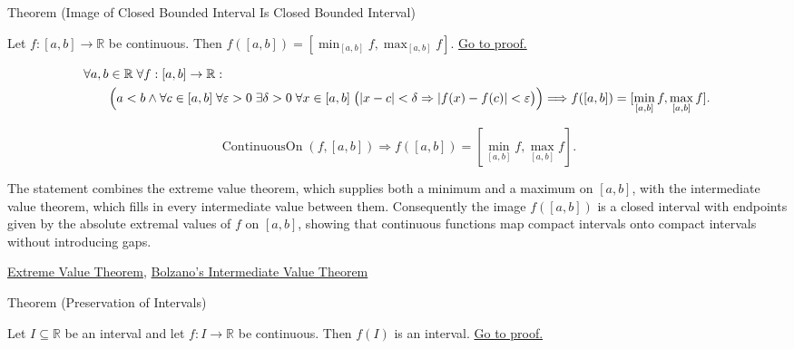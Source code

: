 \begin{theorembox}{Theorem (Image of Closed Bounded Interval Is Closed Bounded Interval)}
\begin{theorem}
\label{thm:image-of-closed-bounded-interval}
Let $f:[a,b]\to\mathbb{R}$ be continuous. Then $f([a,b])=[\min_{[a,b]} f,\max_{[a,b]} f]$.
\hyperref[prf:image-of-closed-bounded-interval]{Go to proof.}
\end{theorem}
\end{theorembox}

\begin{remark*}
\[
\begin{aligned}
&\forall a,b\in\mathbb{R}\;\forall f:[a,b]\to\mathbb{R}:\\
&\qquad
\Bigl(a<b \land
\forall c\in[a,b]\;\forall \varepsilon>0\;\exists \delta>0\;\forall x\in[a,b]\;
\bigl(|x-c|<\delta\Rightarrow |f(x)-f(c)|<\varepsilon\bigr)\Bigr)
\Longrightarrow
f([a,b])=[\min_{[a,b]} f,\max_{[a,b]} f].
\end{aligned}
\]
\end{remark*}

\begin{remark*}
\[
\operatorname{ContinuousOn}(f,[a,b]) \Longrightarrow f([a,b])=[\min_{[a,b]} f,\max_{[a,b]} f].
\]
\end{remark*}

\begin{remark*}[Interpretation]
The statement combines the extreme value theorem, which supplies both a minimum and a maximum on $[a,b]$, with the intermediate value theorem, which fills in every intermediate value between them. Consequently the image $f([a,b])$ is a closed interval with endpoints given by the absolute extremal values of $f$ on $[a,b]$, showing that continuous functions map compact intervals onto compact intervals without introducing gaps.
\end{remark*}

\begin{remark*}[Dependencies]
\hyperref[thm:extreme-value-theorem]{Extreme Value Theorem},
\hyperref[thm:bolzano-intermediate-value]{Bolzano's Intermediate Value Theorem}
\end{remark*}


\begin{theorembox}{Theorem (Preservation of Intervals)}
\begin{theorem}
\label{thm:preservation-of-intervals}
Let $I \subseteq \mathbb{R}$ be an interval and let $f:I \to \mathbb{R}$ be continuous. Then $f(I)$ is an interval.
\hyperref[prf:preservation-of-intervals]{Go to proof.}
\end{theorem}
\end{theorembox}

